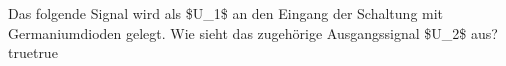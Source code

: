     {Das folgende Signal wird als \$U\_1\$ an den Eingang der Schaltung mit Germaniumdioden gelegt. Wie sieht das zugehörige Ausgangssignal \$U\_2\$ aus?}
    {}
    {}
    {}
    {}
    {true}{true}